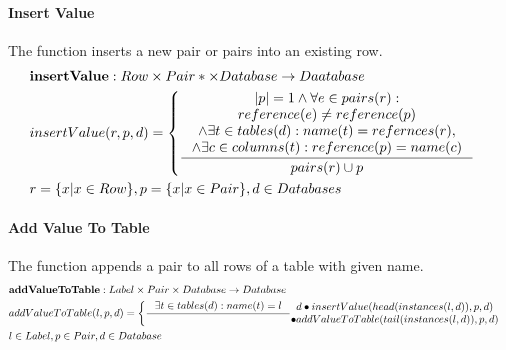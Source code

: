 \documentclass[11pt]{article}
\begin{document}
\paragraph{Insert Value} The function inserts a new pair or pairs into an existing row.
\begin{align*}
&	\mathbf{insertValue} : Row \times Pair* \times Database \rightarrow Daatabase \\
&	insertValue(r, p, d) = \begin{cases}
 		\inference{|p| = 1 \wedge \forall e \in pairs(r) :\\  reference(e) \neq reference(p) \\ \wedge \exists t \in tables(d) : name(t) = refernces(r), \\ \wedge \exists c \in columns(t) : reference(p) = name(c)}{pairs(r) \cup p} 
 		\end{cases} \\
& r = \{ x | x \in Row\}, p = \{ x | x \in Pair\},d \in Databases
\end{align*}

\paragraph{Add Value To Table} The function appends a pair to all rows of a table with given name.
\begin{align*}
&	\mathbf{addValueToTable} : Label \times Pair \times Database \rightarrow Database \\
&	addValueToTable(l, p, d) = \begin{cases}
 		\inference{\exists t \in tables(d) : name(t) = l}	{\begin{gathered}
		d \bullet insertValue(head(instances(l, d)), p, d) \\ \bullet addValueToTable(tail(instances(l, d)), p, d)
	\end{gathered}} 
 	\end{cases}\\ 
& 	l \in Label, p \in Pair,  d \in Database
\end{align*}
\end{document}
